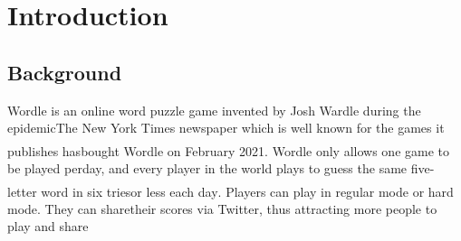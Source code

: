 \documentclass[12pt]{ctexart}
\newcommand{\upcite}[1]{\textsuperscript{\textsuperscript{\cite{#1}}}}%
\begin{document}
\maketitle  %

\tableofcontents  %




\section{Introduction}
\subsection{Background}
Wordle is an online word puzzle game invented by Josh Wardle during the epidemicThe New York Times newspaper which is well known for the games it publishes hasbought Wordle on February 2021\upcite{1}. Wordle only allows one game to be played perday, and every player in the world plays to guess the same five-letter word in six triesor less each day\upcite{2}. Players can play in regular mode or hard mode. They can sharetheir scores via Twitter, thus attracting more people to play and share







\end{document}
